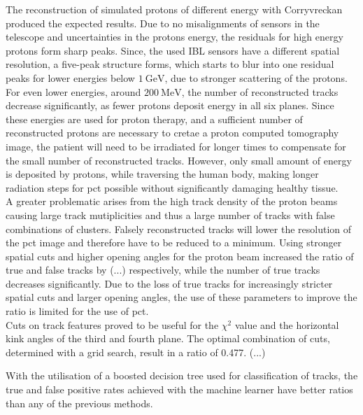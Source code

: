 The reconstruction of simulated protons of different energy with Corryvreckan produced the expected results. Due to no misalignments of sensors in the telescope and uncertainties
in the protons energy, the residuals for high energy protons form sharp peaks. Since, the used IBL sensors have a different spatial resolution, a five-peak structure
forms, which starts to blur into one residual peaks for lower energies below $\SI{1}{\giga\eV}$, due to stronger scattering of the protons. For even lower energies,
around $\SI{200}{\mega\eV}$, the number of reconstructed tracks decrease significantly, as fewer protons deposit energy in all six planes. Since these energies are
used for proton therapy, and a sufficient number of reconstructed protons are necessary to cretae a proton computed tomography image, the patient
will need to be irradiated for longer times to compensate for the small number of reconstructed tracks. However, only small amount of energy is deposited by protons, while traversing
the human body, making longer radiation steps for pct possible without significantly damaging healthy tissue. \\
A greater problematic arises from the high track density of the proton beams causing large track mutiplicities and thus a large number of tracks with false combinations of
clusters. Falsely reconstructed tracks will lower the resolution of the pct image and therefore have to be reduced to a minimum. Using stronger spatial cuts and higher
opening angles for the proton beam increased the ratio of true and false tracks by (...) respectively, while the number of true tracks decreases significantly. Due to the loss of
true tracks for increasingly stricter spatial cuts and larger opening angles, the use of these parameters to improve the ratio is limited for the use of pct. \\
Cuts on track features proved to be useful for the $\chi^2$ value and the horizontal kink angles of the third and fourth plane. The optimal combination of cuts, determined
with a grid search, result in a ratio of 0.477. (...)

With the utilisation of a boosted decision tree used for classification of tracks, the true and false positive rates achieved with the machine learner have better ratios
than any of the previous methods. 
